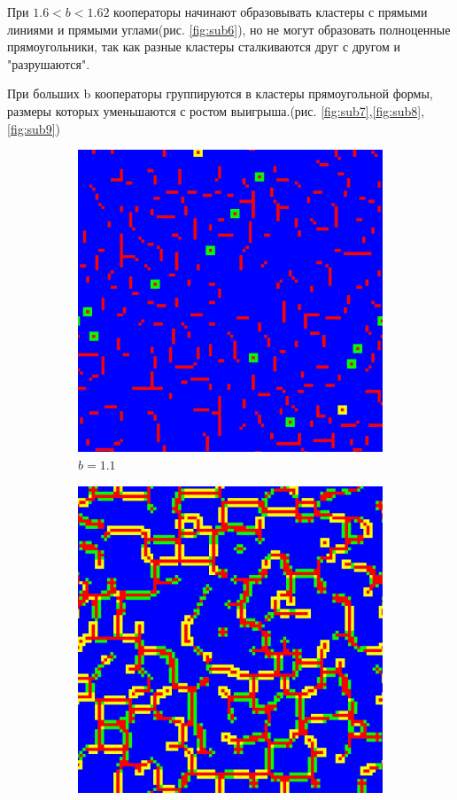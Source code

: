 \documentclass[12pt]{article}
\begin{document}
    При $1.6<b<1.62$ кооператоры начинают образовывать кластеры с прямыми линиями и прямыми углами(рис. \ref{fig:sub6}), но не могут образовать полноценные прямоугольники, так как разные кластеры сталкиваются друг с другом и "разрушаются".

    При больших b кооператоры группируются в кластеры прямоугольной формы, размеры которых уменьшаются с ростом выигрыша.(рис. \ref{fig:sub7},\ref{fig:sub8},\ref{fig:sub9})

    \begin{figure}[!htbp]
        \centering
        \captionsetup{justification=centering}
        \begin{subfigure}{.33\textwidth}
          \centering
          \includegraphics[width=.9\linewidth]{MeanFieldGame/snapshot_b=11.jpg}
          \caption{$b=1.1$}
          \label{fig:sub1}
        \end{subfigure}%
        \begin{subfigure}{.33\textwidth}
          \centering
          \includegraphics[width=.9\linewidth]{MeanFieldGame/snapshot_b=13.jpg}

\end{subfigure}
\end{figure}
\end{document}
